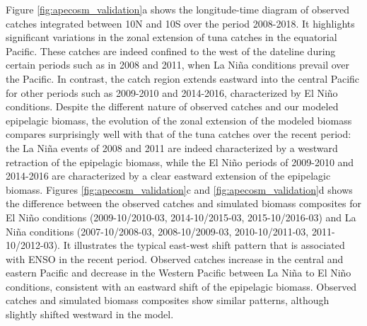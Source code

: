 Figure \ref{fig:apecosm_validation}a shows the longitude-time diagram of observed catches integrated between 10N and 10S over the period 2008-2018. It highlights significant variations in the zonal extension of tuna catches in the equatorial Pacific. These catches are indeed confined to the west of the dateline during certain periods such as in 2008 and 2011, when La Niña conditions prevail over the Pacific. In contrast, the catch region extends eastward into the central Pacific for other periods such as 2009-2010 and 2014-2016, characterized by El Niño conditions. Despite the different nature of observed catches and our modeled epipelagic biomass, the evolution of the zonal extension of the modeled biomass compares surprisingly well with that of the tuna catches over the recent period: the La Niña events of 2008 and 2011 are indeed characterized by a westward retraction of the epipelagic biomass, while the El Niño periods of 2009-2010 and 2014-2016 are characterized by a clear eastward extension of the epipelagic biomass. Figures \ref{fig:apecosm_validation}c and \ref{fig:apecosm_validation}d shows the difference between the observed catches and simulated biomass composites for El Niño conditions (2009-10/2010-03, 2014-10/2015-03, 2015-10/2016-03) and La Niña conditions (2007-10/2008-03, 2008-10/2009-03, 2010-10/2011-03, 2011-10/2012-03). It illustrates the typical east-west shift pattern that is associated with ENSO in the recent period. Observed catches increase in the central and eastern Pacific and decrease in the Western Pacific between La Niña to El Niño conditions, consistent with an eastward shift of the epipelagic biomass. Observed catches and simulated biomass composites show similar patterns, although slightly shifted westward in the model.

